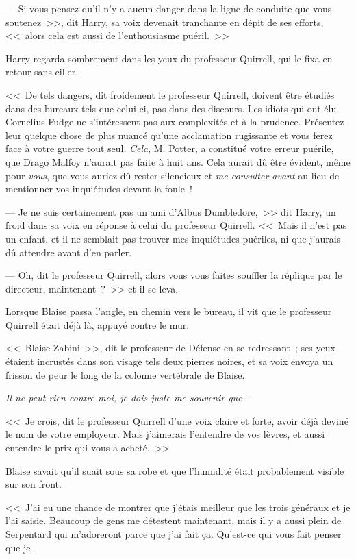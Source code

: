 --- Si vous pensez qu'il n'y a aucun danger dans la ligne de conduite que vous soutenez~>>, dit Harry, sa voix devenait tranchante en dépit de ses efforts, <<~alors cela est aussi de l'enthousiasme puéril.~>>

Harry regarda sombrement dans les yeux du professeur Quirrell, qui le fixa en retour sans ciller.

<<~De tels dangers, dit froidement le professeur Quirrell, doivent être étudiés dans des bureaux tels que celui-ci, pas dans des discours. Les idiots qui ont élu Cornelius Fudge ne s'intéressent pas aux complexités et à la prudence. Présentez-leur quelque chose de plus nuancé qu'une acclamation rugissante et vous ferez face à votre guerre tout seul. \emph{Cela}, M. Potter, a constitué votre erreur puérile, que Drago Malfoy n'aurait pas faite à huit ans. Cela aurait dû être évident, même pour \emph{vous}, que vous auriez dû rester silencieux et \emph{me consulter avant} au lieu de mentionner vos inquiétudes devant la foule~!

--- Je ne suis certainement pas un ami d'Albus Dumbledore,~>> dit Harry, un froid dans sa voix en réponse à celui du professeur Quirrell. <<~Mais il n'est pas un enfant, et il ne semblait pas trouver mes inquiétudes puériles, ni que j'aurais dû attendre avant d'en parler.

--- Oh, dit le professeur Quirrell, alors vous vous faites souffler la réplique par le directeur, maintenant~?~>> et il se leva.

\later

Lorsque Blaise passa l'angle, en chemin vers le bureau, il vit que le professeur Quirrell était déjà là, appuyé contre le mur.

<<~Blaise Zabini~>>, dit le professeur de Défense en se redressant~; ses yeux étaient incrustés dans son visage tels deux pierres noires, et sa voix envoya un frisson de peur le long de la colonne vertébrale de Blaise.

\emph{Il ne peut rien contre moi, je dois juste me souvenir que -}

<<~Je crois, dit le professeur Quirrell d'une voix claire et forte, avoir déjà deviné le nom de votre employeur. Mais j'aimerais l'entendre de vos lèvres, et aussi entendre le prix qui vous a acheté.~>>

Blaise savait qu'il suait sous sa robe et que l'humidité était probablement visible sur son front.

<<~J'ai eu une chance de montrer que j'étais meilleur que les trois généraux et je l'ai saisie. Beaucoup de gens me détestent maintenant, mais il y a aussi plein de Serpentard qui m'adoreront parce que j'ai fait ça. Qu'est-ce qui vous fait penser que je -

